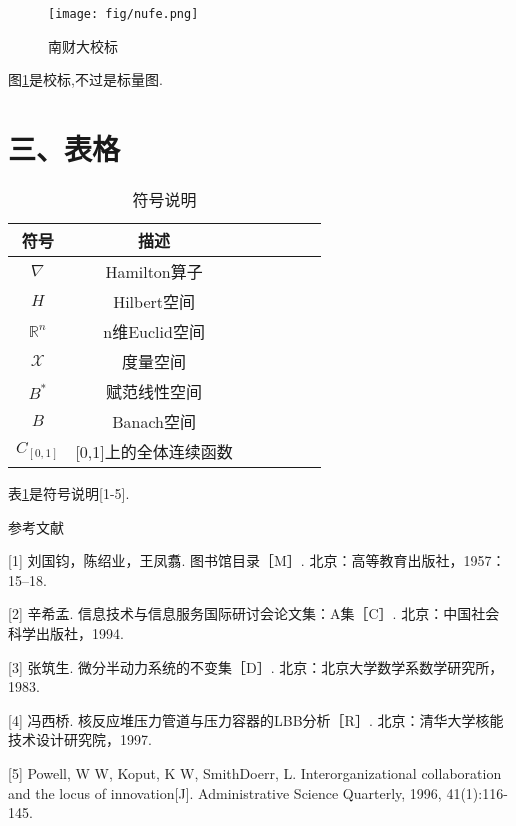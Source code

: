 \documentclass[a4paper]{article}
\newcommand{\cankaowenxian}{\CJKfamily{fsong}\fontsize{10.5pt}{15.75pt}\selectfont}
\newcommand{\biaoge}{\CJKfamily{fsong}\fontsize{10.5pt}{13.125pt}\selectfont}
\newcommand{\biaocaption}[1]{\caption{\hspace{1em}#1}}
\newcommand{\tucaption}[1]{\caption{\hspace{1em}#1}}
\begin{document}
{\begin{figure}[htpb]
    \centering
    \texttt{[image: fig/nufe.png]}
    \tucaption{南财大校标}
    \label{校标}
\end{figure}
图\ref{校标}是校标,不过是标量图.


\section*{三、表格}

{\biaoge
\begin{table}[H]
  \centering  %
  \biaocaption{符号说明}  %
  \label{notion} %
  \begin{tabular}{ccccccc} %
  \toprule  %
  {\bf 符号}  & {\bf 描述}\\[0.2cm]
  \midrule  %

$\nabla$ & Hamilton算子 \\[0.2cm]

$H$ & Hilbert空间 \\[0.2cm]

$\mathbb{R}^n$ & n维Euclid空间 \\[0.2cm]

$\mathscr{X}$ & 度量空间 \\[0.2cm]

$B^*$ & 赋范线性空间 \\[0.2cm]

$B$ & Banach空间 \\[0.2cm]

$C_{[0,1]}$ & [0,1]上的全体连续函数 \\[0.2cm]

\bottomrule  %
\end{tabular}
\end{table}
}
表\ref{notion}是符号说明[1-5].


}

\vspace{2em}


{\cankaowenxian

\begin{center}
  {\fontsize{12pt}{28pt}\selectfont 参考文献}
\end{center}

[1] 刘国钧，陈绍业，王凤翥. 图书馆目录［M］. 北京：高等教育出版社，1957：15–18.

[2] 辛希孟. 信息技术与信息服务国际研讨会论文集：A集［C］. 北京：中国社会科学出版社，1994.

[3] 张筑生. 微分半动力系统的不变集［D］. 北京：北京大学数学系数学研究所，1983.

[4] 冯西桥. 核反应堆压力管道与压力容器的LBB分析［R］. 北京：清华大学核能技术设计研究院，1997.

[5] Powell, W W, Koput, K W, SmithDoerr, L. Interorganizational collaboration and the locus of innovation[J]. Administrative Science Quarterly, 1996, 41(1):116-145.

}
\end{document}
